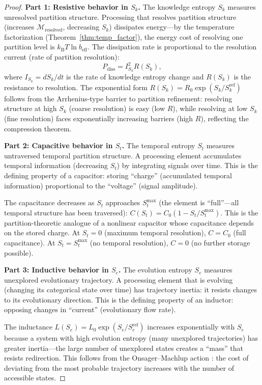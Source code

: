 \documentclass[twocolumn,10pt]{article}
\theoremstyle{remark}
\newcommand{\kB}{k_{\mathrm{B}}}
\newcommand{\Depth}{\mathcal{M}}
\newcommand{\Sk}{S_k}
\newcommand{\St}{S_t}
\newcommand{\Se}{S_e}
\newcommand{\beff}{b_{\mathrm{eff}}}
\begin{document}
\begin{proof}
\textbf{Part 1: Resistive behavior in $\Sk$.}
The knowledge entropy $\Sk$ measures unresolved partition structure. Processing that resolves partition structure (increases $\Depth_{\mathrm{resolved}}$, decreasing $\Sk$) dissipates energy---by the temperature factorization (Theorem~\ref{thm:temp_factor}), the energy cost of resolving one partition level is $\kB T \ln \beff$. The dissipation rate is proportional to the resolution current (rate of partition resolution):
\begin{equation}
P_{\mathrm{diss}} = I_{\Sk}^2 R(\Sk),
\end{equation}
where $I_{\Sk} = d\Sk/dt$ is the rate of knowledge entropy change and $R(\Sk)$ is the resistance to resolution. The exponential form $R(\Sk) = R_0 \exp(\Sk/\Sk^{\mathrm{ref}})$ follows from the Arrhenius-type barrier \cite{arrhenius1889} to partition refinement: resolving structure at high $\Sk$ (coarse resolution) is easy (low $R$), while resolving at low $\Sk$ (fine resolution) faces exponentially increasing barriers (high $R$), reflecting the compression theorem.

\textbf{Part 2: Capacitive behavior in $\St$.}
The temporal entropy $\St$ measures untraversed temporal partition structure. A processing element accumulates temporal information (decreasing $\St$) by integrating signals over time. This is the defining property of a capacitor: storing ``charge'' (accumulated temporal information) proportional to the ``voltage'' (signal amplitude).

The capacitance decreases as $\St$ approaches $\St^{\max}$ (the element is ``full''---all temporal structure has been traversed): $C(\St) = C_0(1 - \St/\St^{\max})$. This is the partition-theoretic analogue of a nonlinear capacitor whose capacitance depends on the stored charge. At $\St = 0$ (maximum temporal resolution), $C = C_0$ (full capacitance). At $\St = \St^{\max}$ (no temporal resolution), $C = 0$ (no further storage possible).

\textbf{Part 3: Inductive behavior in $\Se$.}
The evolution entropy $\Se$ measures unexplored evolutionary trajectory. A processing element that is evolving (changing its categorical state over time) has trajectory inertia: it resists changes to its evolutionary direction. This is the defining property of an inductor: opposing changes in ``current'' (evolutionary flow rate).

The inductance $L(\Se) = L_0 \exp(\Se/\Se^{\mathrm{ref}})$ increases exponentially with $\Se$ because a system with high evolution entropy (many unexplored trajectories) has greater inertia---the large number of unexplored states creates a ``mass'' that resists redirection. This follows from the Onsager--Machlup action \cite{onsager1953}: the cost of deviating from the most probable trajectory increases with the number of accessible states.


\end{proof}
\end{document}

